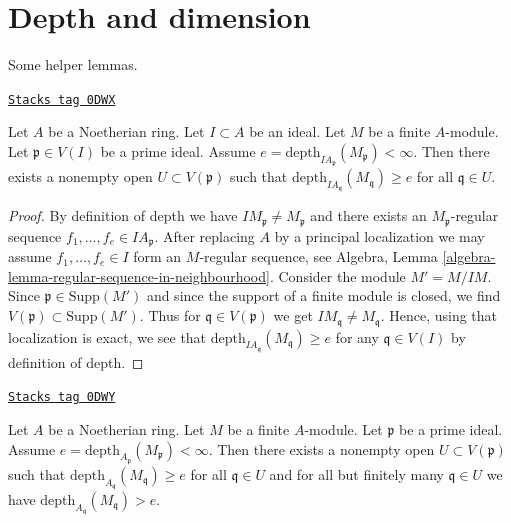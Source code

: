 \section{Depth and dimension}
\label{local-cohomology-section-dept-dimension}
Some helper lemmas.

\begin{lemma}
\label{local-cohomology-lemma-ideal-depth-function}
\href{https://stacks.math.columbia.edu/tag/0DWX}{\texttt{Stacks tag 0DWX}}

Let $A$ be a Noetherian ring. Let $I \subset A$ be an ideal.
Let $M$ be a finite $A$-module. Let $\mathfrak p \in V(I)$
be a prime ideal. Assume
$e = \text{depth}_{IA_\mathfrak p}(M_\mathfrak p) < \infty$.
Then there exists a nonempty open $U \subset V(\mathfrak p)$
such that $\text{depth}_{IA_\mathfrak q}(M_\mathfrak q) \geq e$
for all $\mathfrak q \in U$.
\end{lemma}

\begin{proof}
By definition of depth we have $IM_\mathfrak p \not = M_\mathfrak p$
and there exists an $M_\mathfrak p$-regular sequence
$f_1, \ldots, f_e \in IA_\mathfrak p$. After replacing $A$ by
a principal localization we may assume $f_1, \ldots, f_e \in I$
form an $M$-regular sequence, see
Algebra, Lemma \ref{algebra-lemma-regular-sequence-in-neighbourhood}.
Consider the module $M' = M/IM$. Since $\mathfrak p \in \text{Supp}(M')$
and since the support of a finite module is closed, we find
$V(\mathfrak p) \subset \text{Supp}(M')$. Thus
for $\mathfrak q \in V(\mathfrak p)$ we get
$IM_\mathfrak q \not = M_\mathfrak q$. Hence, using that
localization is exact, we see that
$\text{depth}_{IA_\mathfrak q}(M_\mathfrak q) \geq e$
for any $\mathfrak q \in V(I)$ by definition of depth.
\end{proof}

\begin{lemma}
\label{local-cohomology-lemma-depth-function}
\href{https://stacks.math.columbia.edu/tag/0DWY}{\texttt{Stacks tag 0DWY}}

Let $A$ be a Noetherian ring. Let $M$ be a finite $A$-module.
Let $\mathfrak p$ be a prime ideal. Assume
$e = \text{depth}_{A_\mathfrak p}(M_\mathfrak p) < \infty$.
Then there exists a nonempty open $U \subset V(\mathfrak p)$
such that $\text{depth}_{A_\mathfrak q}(M_\mathfrak q) \geq e$
for all $\mathfrak q \in U$ and
for all but finitely many $\mathfrak q \in U$ we have
$\text{depth}_{A_\mathfrak q}(M_\mathfrak q) > e$.
\end{lemma}


